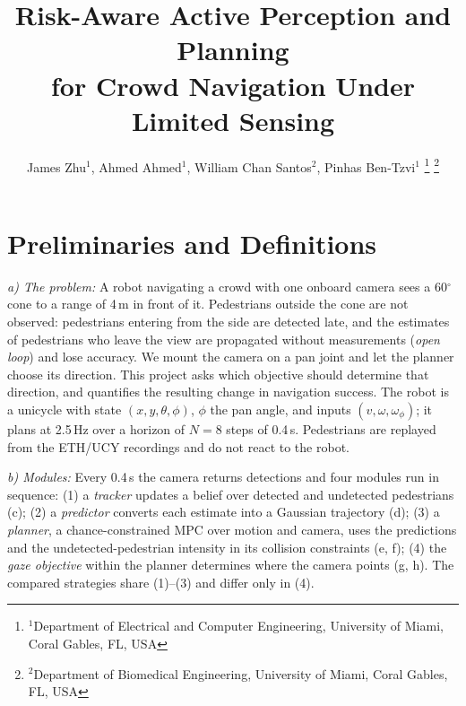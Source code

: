 \documentclass[letterpaper, 10 pt, conference]{ieeeconf}
\begin{document}

\title{\LARGE \bf Risk-Aware Active Perception and Planning \\ for Crowd Navigation Under Limited Sensing}

\author{James Zhu$^{1}$, Ahmed Ahmed$^{1}$, William Chan Santos$^{2}$, Pinhas Ben-Tzvi$^{1}$%
\thanks{$^{1}$Department of Electrical and Computer Engineering, University of Miami, Coral Gables, FL, USA}%
\thanks{$^{2}$Department of Biomedical Engineering, University of Miami, Coral Gables, FL, USA}%
}

\maketitle
\thispagestyle{empty}
\pagestyle{empty}

\section{Preliminaries and Definitions}

\textit{a) The problem:} A robot navigating a crowd with one onboard camera sees a 60$^\circ$ cone to a range of 4\,m in front of it. Pedestrians outside the cone are not observed: pedestrians entering from the side are detected late, and the estimates of pedestrians who leave the view are propagated without measurements (\emph{open loop}) and lose accuracy. We mount the camera on a pan joint and let the planner choose its direction. This project asks which objective should determine that direction, and quantifies the resulting change in navigation success. The robot is a unicycle with state $(x, y, \theta, \phi)$, $\phi$ the pan angle, and inputs $(v, \omega, \omega_\phi)$; it plans at 2.5\,Hz over a horizon of $N{=}8$ steps of 0.4\,s. Pedestrians are replayed from the ETH/UCY recordings and do not react to the robot.

\textit{b) Modules:} Every 0.4\,s the camera returns detections and four modules run in sequence: (1) a \emph{tracker} updates a belief over detected and undetected pedestrians (c); (2) a \emph{predictor} converts each estimate into a Gaussian trajectory (d); (3) a \emph{planner}, a chance-constrained MPC over motion and camera, uses the predictions and the undetected-pedestrian intensity in its collision constraints (e, f); (4) the \emph{gaze objective} within the planner determines where the camera points (g, h). The compared strategies share (1)--(3) and differ only in (4).
\end{document}
